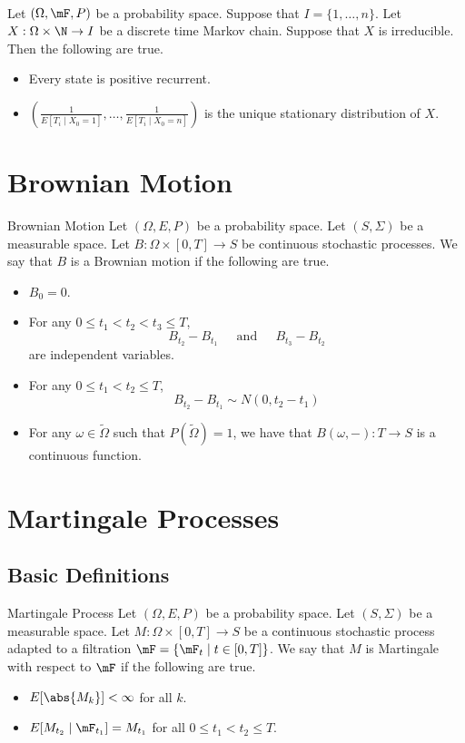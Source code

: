\documentclass[a4paper]{article}
\begin{document}
\begin{prp}{}{}\\
Let $(\Omega,\mF,P)$ be a probability space. Suppose that $I=\{1,\dots,n\}$. Let $X:\Omega\times\N\to I$ be a discrete time Markov chain. Suppose that $X$ is irreducible. Then the following are true. 
\begin{itemize}
\item Every state is positive recurrent. 
\item $\left(\frac{1}{E[T_i\;|\;X_0=1]},\dots,\frac{1}{E[T_i\;|\;X_0=n]}\right)$ is the unique stationary distribution of $X$. 
\end{itemize}
\end{prp}

\pagebreak
\section{Brownian Motion}
\begin{defn}{Brownian Motion}{} Let $(\Omega,E,P)$ be a probability space. Let $(S,\Sigma)$ be a measurable space. Let $B:\Omega\times[0,T]\to S$ be continuous stochastic processes. We say that $B$ is a Brownian motion if the following are true. 
\begin{itemize}
\item $B_0=0$. 
\item For any $0\leq t_1<t_2<t_3\leq T$, $$B_{t_2}-B_{t_1}\;\;\;\;\text{ and }\;\;\;\;B_{t_3}-B_{t_2}$$ are independent variables. 
\item For any $0\leq t_1<t_2\leq T$, $$B_{t_2}-B_{t_1}\sim N(0,t_2-t_1)$$
\item For any $\omega\in\widetilde{\Omega}$ such that $P(\widetilde{\Omega})=1$, we have that $B(\omega,-):T\to S$ is a continuous function. 
\end{itemize}
\end{defn}

\pagebreak
\section{Martingale Processes}
\subsection{Basic Definitions}
\begin{defn}{Martingale Process}{} Let $(\Omega,E,P)$ be a probability space. Let $(S,\Sigma)$ be a measurable space. Let $M:\Omega\times[0,T]\to S$ be a continuous stochastic process adapted to a filtration $\mF=\{\mF_t\;|\;t\in[0,T]\}$. We say that $M$ is Martingale with respect to $\mF$ if the following are true. 
\begin{itemize}
\item $E[\abs{M_k}]<\infty$ for all $k$. 
\item $E[M_{t_2}\;|\;\mF_{t_1}]=M_{t_1}$ for all $0\leq t_1<t_2\leq T$. 
\end{itemize}
\end{defn}
\end{document}
